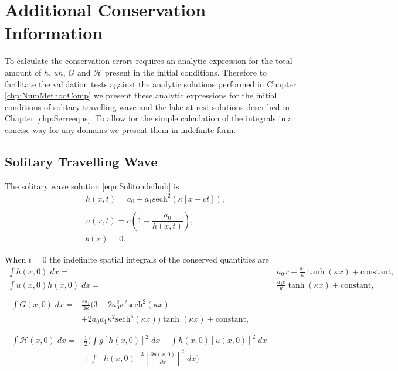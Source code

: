\chapter{Additional Conservation Information}
\label{app:ConQuant}
To calculate the conservation errors requires an analytic expression for the total amount of $h$, $uh$, $G$ and $\mathcal{H}$ present in the initial conditions. Therefore to facilitate the validation tests against the analytic solutions performed in Chapter \ref{chp:NumMethodComp} we present these analytic expressions for the initial conditions of solitary travelling wave and the lake at rest solutions described in Chapter \ref{chp:Serreeqns}. To allow for the simple calculation of the integrals in a concise way for any domains we present them in indefinite form. 

\section{Solitary Travelling Wave}
The solitary wave solution \eqref{eqn:Solitondefhub} is
	\begin{align*}
	&h(x,t) = a_0 + a_1\text{sech}^2\left(\kappa \left[x - ct\right]\right), \\  \nonumber \\
	&u(x,t) = c\left(1 - \dfrac{a_0}{h(x,t)}\right), \\
	&b(x) = 0.
	\end{align*}

When $t=0$ the indefinite spatial integrals of the conserved quantities are
\allowdisplaybreaks
\begin{subequations}
	\begin{align}
	\int h(x,0) \; dx = {} & a_0 x + \frac{a_1}{\kappa} \tanh\left(\kappa x\right) + \text{constant}, \label{eqn:SolitonConservationh} \\
	\int u(x,0)h(x,0) \;  dx = {} & \frac{a_1 c}{\kappa} \tanh\left(\kappa x\right)+ \text{constant}, \label{eqn:SolitonConservationuh} \\  \nonumber \\
	\begin{split}
	\int G(x,0) \; dx = {}&  \frac{c a_1}{3 \kappa}  \Bigg(3 + 2a_0^2 \kappa^2\text{sech}^2\left(\kappa x\right)  \\ &+ 2a_0 a_1 \kappa^2 \text{sech}^4\left(\kappa x\right) \Bigg)\tanh\left(\kappa x\right)  + \text{constant} ,
	\end{split} \label{eqn:SolitonConservationG}
	\\  \nonumber \\
	\begin{split}
	\int \mathcal{H}(x,0) \; dx = {}&\frac{1}{2} \Bigg(\int g\left[h(x,0)\right]^2 \; dx + \int h(x,0)\left[u(x,0)\right]^2 \; dx  \\ &+ \int \left[h(x,0)\right]^3 \left[\frac{\partial u(x,0)}{\partial x}\right]^2 \; dx \Bigg) \label{eqn:SolitonConservationH}
	\end{split}
	\end{align}
	\label{eqn:SolitonConservation}
\end{subequations}

